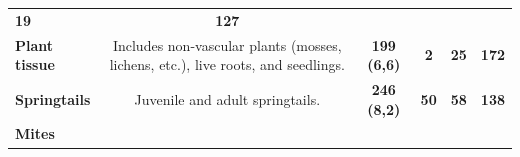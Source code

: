\documentclass[10pt,oneside]{article}
\begin{document}
\begin{longtable}[]{@{}lccccc@{}}
\begin{minipage}[t]{0.04\columnwidth}
\textbf{19}\strut
\end{minipage} & \begin{minipage}[t]{0.04\columnwidth}\centering
\textbf{127}\strut
\end{minipage}\tabularnewline
\begin{minipage}[t]{0.11\columnwidth}\raggedright
\textbf{Plant tissue}\strut
\end{minipage} & \begin{minipage}[t]{0.45\columnwidth}\centering
Includes non-vascular plants (mosses, lichens, etc.), live roots, and
seedlings.\strut
\end{minipage} & \begin{minipage}[t]{0.14\columnwidth}\centering
\textbf{199 (6,6)}\strut
\end{minipage} & \begin{minipage}[t]{0.04\columnwidth}\centering
\textbf{2}\strut
\end{minipage} & \begin{minipage}[t]{0.04\columnwidth}\centering
\textbf{25}\strut
\end{minipage} & \begin{minipage}[t]{0.04\columnwidth}\centering
\textbf{172}\strut
\end{minipage}\tabularnewline
\begin{minipage}[t]{0.11\columnwidth}\raggedright
\textbf{Springtails}\strut
\end{minipage} & \begin{minipage}[t]{0.45\columnwidth}\centering
Juvenile and adult springtails.\strut
\end{minipage} & \begin{minipage}[t]{0.14\columnwidth}\centering
\textbf{246 (8,2)}\strut
\end{minipage} & \begin{minipage}[t]{0.04\columnwidth}\centering
\textbf{50}\strut
\end{minipage} & \begin{minipage}[t]{0.04\columnwidth}\centering
\textbf{58}\strut
\end{minipage} & \begin{minipage}[t]{0.04\columnwidth}\centering
\textbf{138}\strut
\end{minipage}\tabularnewline
\begin{minipage}[t]{0.11\columnwidth}\raggedright
\textbf{Mites}\strut
\end{minipage} & \begin{minipage}[t]{0.45\columnwidth}\centering

\end{minipage}
\end{longtable}
\end{document}
